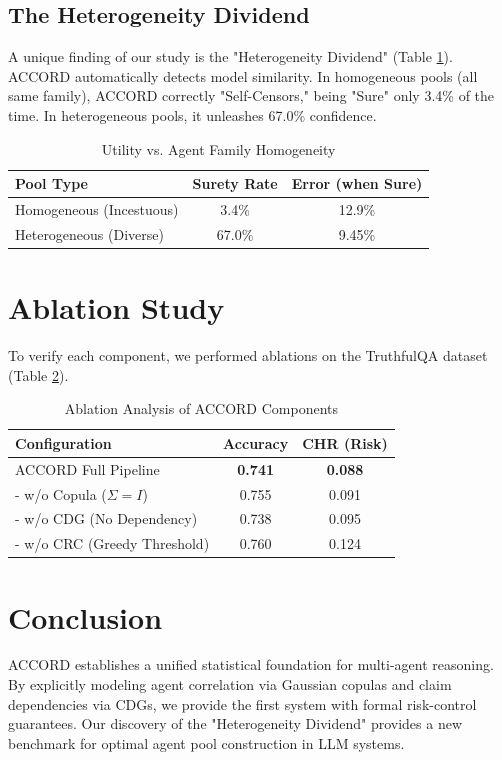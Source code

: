 \documentclass[conference]{IEEEtran}
\begin{document}
\subsection{The Heterogeneity Dividend}
A unique finding of our study is the "Heterogeneity Dividend" (Table \ref{tab:hetero}). ACCORD automatically detects model similarity. In homogeneous pools (all same family), ACCORD correctly "Self-Censors," being "Sure" only 3.4\% of the time. In heterogeneous pools, it unleashes 67.0\% confidence.

\begin{table}[htbp]
\caption{Utility vs. Agent Family Homogeneity}
\label{tab:hetero}
\begin{center}
\begin{tabular}{lcc}
\toprule
Pool Type & Surety Rate & Error (when Sure) \\
\midrule
Homogeneous (Incestuous) & 3.4\% & 12.9\% \\
Heterogeneous (Diverse) & 67.0\% & 9.45\% \\
\bottomrule
\end{tabular}
\end{center}
\end{table}

\section{Ablation Study}
To verify each component, we performed ablations on the TruthfulQA dataset (Table \ref{tab:ablation}).

\begin{table}[htbp]
\caption{Ablation Analysis of ACCORD Components}
\label{tab:ablation}
\begin{center}
\begin{tabular}{lcc}
\toprule
Configuration & Accuracy & CHR (Risk) \\
\midrule
ACCORD Full Pipeline & \textbf{0.741} & \textbf{0.088} \\
- w/o Copula ($\Sigma = I$) & 0.755 & 0.091 \\
- w/o CDG (No Dependency) & 0.738 & 0.095 \\
- w/o CRC (Greedy Threshold) & 0.760 & 0.124 \\
\bottomrule
\end{tabular}
\end{center}
\end{table}

\section{Conclusion}
ACCORD establishes a unified statistical foundation for multi-agent reasoning. By explicitly modeling agent correlation via Gaussian copulas and claim dependencies via CDGs, we provide the first system with formal risk-control guarantees. Our discovery of the "Heterogeneity Dividend" provides a new benchmark for optimal agent pool construction in LLM systems.
\end{document}
